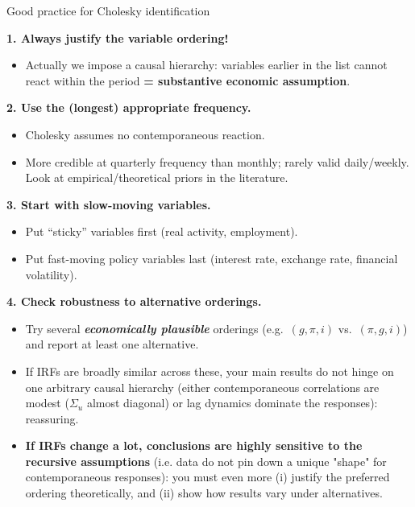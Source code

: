 \documentclass{beamer}
\begin{document}
\begin{frame}{Good practice for Cholesky identification}
\scriptsize

\textbf{1. Always justify the variable ordering!}
\begin{itemize}
  \item  Actually we impose a causal hierarchy: variables earlier in the list cannot react within the period \textbf{= substantive economic assumption}.
\end{itemize}

\pause

\textbf{2. Use the (longest) appropriate frequency.}
\begin{itemize}
  \item Cholesky assumes no contemporaneous reaction.
  \item More credible at quarterly frequency than monthly; rarely valid daily/weekly. Look at empirical/theoretical priors in the literature.
\end{itemize}

\pause
\textbf{3. Start with slow-moving variables.}
\begin{itemize}
  \item Put “sticky” variables first (real activity, employment).
  \item Put fast-moving policy variables last (interest rate, exchange rate, financial volatility).
\end{itemize}

\pause
\textbf{4. Check robustness to alternative orderings.}
\begin{itemize}
  \item Try several\textbf{ \emph{economically plausible} }orderings (e.g.\ $(g,\pi,i)$ vs.\ $(\pi,g,i)$) and report at least one alternative.
  \item If IRFs are broadly similar across these, your main results do not hinge on one arbitrary causal hierarchy (either contemporaneous correlations are modest ($\Sigma_u$ almost diagonal) or lag dynamics dominate the responses): reassuring.
  \item \textbf{If IRFs change a lot, conclusions are highly sensitive to the recursive assumptions} (i.e. data do not pin down a unique "shape" for contemporaneous responses): you must even more (i) justify the preferred ordering theoretically, and (ii) show how results vary under alternatives.
\end{itemize}

\end{frame}
\end{document}
